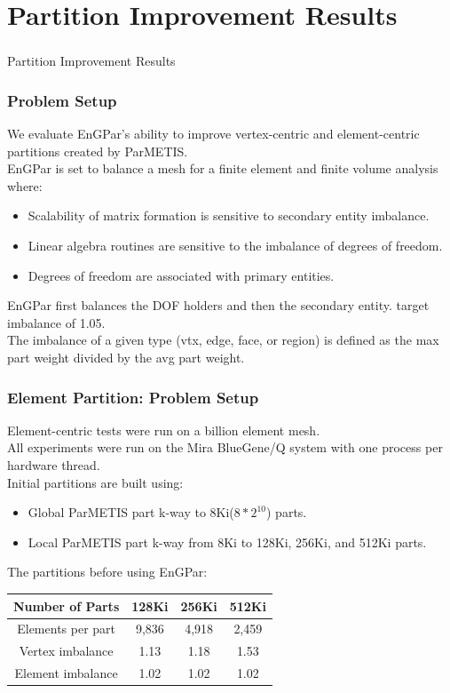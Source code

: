 \documentclass[aspectratio=169]{beamer}
\begin{document}
\section{Partition Improvement Results}
\begin{frame}
  \frametitle{}
  \center \huge{Partition Improvement Results}
\end{frame}

\begin{frame}
  \frametitle{Problem Setup}
  We evaluate EnGPar's ability to improve vertex-centric
  and element-centric partitions created by ParMETIS.\\
  \medskip
  EnGPar is set to balance a mesh for a finite element and finite volume analysis where:
  \begin{itemize}
    \item Scalability of matrix formation is sensitive to secondary entity imbalance.
    \item Linear algebra routines are sensitive to the imbalance of degrees of freedom.
    \item Degrees of freedom are associated with primary entities.
  \end{itemize}
  \bigskip
  EnGPar first balances the DOF holders and then the secondary entity.
  target imbalance of 1.05. \\
  The imbalance of a given type (vtx, edge, face, or region) is defined as the 
  max part weight divided by the avg part weight.
\end{frame}

\begin{frame}
  \frametitle{Element Partition: Problem Setup}
  \medskip
  Element-centric tests were run on a billion element mesh. \\
  All experiments were run on the Mira BlueGene/Q system with one process per
  hardware thread. \\
  \smallskip
  Initial partitions are built using:
  \begin{itemize}
  \item Global ParMETIS part k-way to 8Ki($8*2^{10}$) parts.
  \item Local ParMETIS part k-way from 8Ki to 128Ki, 256Ki, and 512Ki parts.
  \end{itemize}
  The partitions before using EnGPar:\\
  \begin{table}[!h]
    \centering
    \begin{tabular}{||c|c|c|c||}
      \hline
      Number of Parts &128Ki&256Ki&512Ki \\
      \hline
      Elements per part & 9,836 & 4,918&2,459  \\
      \hline
      Vertex imbalance & 1.13 & 1.18 & 1.53 \\
      \hline
      Element imbalance & 1.02& 1.02& 1.02\\
      \hline
    \end{tabular}
  \end{table}
\end{frame}
\end{document}
